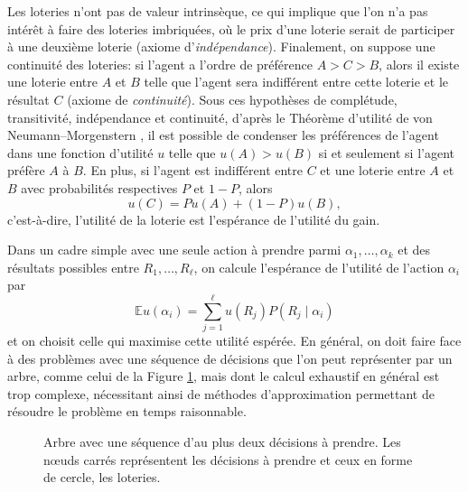 \documentclass[a4paper,11pt]{article}
\theoremstyle{plain}
\theoremstyle{definition}
\begin{document}
Les loteries n'ont pas de valeur intrinsèque, ce qui implique que l'on n'a pas intérêt à faire des loteries imbriquées, où le prix d'une loterie serait de participer à une deuxième loterie (axiome d'\emph{indépendance}). Finalement, on suppose une continuité des loteries: si l'agent a l'ordre de préférence $A > C > B$, alors il existe une loterie entre $A$ et $B$ telle que l'agent sera indifférent entre cette loterie et le résultat $C$ (axiome de \emph{continuité}). Sous ces hypothèses de complétude, transitivité, indépendance et continuité, d'après le Théorème d'utilité de von Neumann--Morgenstern \cite{vonNeumann1953Theory}, il est possible de condenser les préférences de l'agent dans une fonction d'utilité $u$ telle que $u(A) > u(B)$ si et seulement si l'agent préfère $A$ à $B$. En plus, si l'agent est indifférent entre $C$ et une loterie entre $A$ et $B$ avec probabilités respectives $P$ et $1-P$, alors \[u(C) = Pu(A) + (1-P)u(B),\] c'est-à-dire, l'utilité de la loterie est l'espérance de l'utilité du gain.

Dans un cadre simple avec une seule action à prendre parmi $\alpha_1, \dotsc, \alpha_k$ et des résultats possibles entre $R_1, \dotsc, R_\ell$, on calcule l'espérance de l'utilité de l'action $\alpha_i$ par \[\mathbb E u(\alpha_i) = \sum_{j = 1}^\ell u(R_j)P(R_j\mid\alpha_i)\] et on choisit celle qui maximise cette utilité espérée. En général, on doit faire face à des problèmes avec une séquence de décisions que l'on peut représenter par un arbre, comme celui de la Figure \ref{arbre}, mais dont le calcul exhaustif en général est trop complexe, nécessitant ainsi de méthodes d'approximation permettant de résoudre le problème en temps raisonnable.

\begin{figure}[ht]
\centering
{}
\caption{Arbre avec une séquence d'au plus deux décisions à prendre. Les nœuds carrés représentent les décisions à prendre et ceux en forme de cercle, les loteries.}
\label{arbre}
\end{figure}
\end{document}
